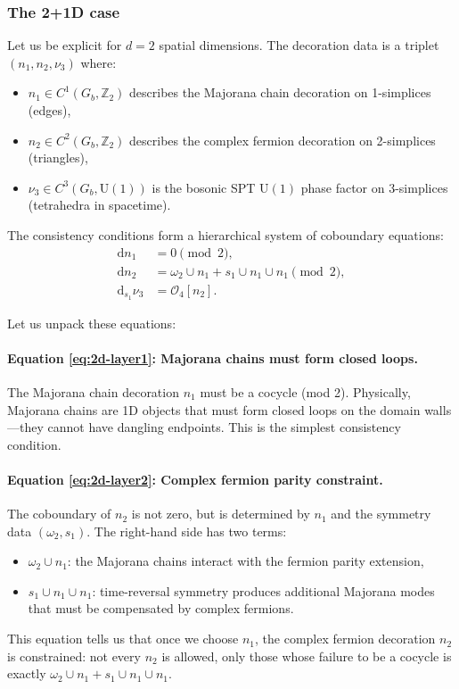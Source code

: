 \documentclass{SciPost}
\theoremstyle{definition}
\newcommand{\Zt}{\mathbb{Z}_2}
\newcommand{\U}{\mathrm{U}}
\newcommand{\Gb}{G_b}
\newcommand{\dd}{\mathrm{d}}
\begin{document}
\subsubsection{The 2+1D case}

Let us be explicit for $d=2$ spatial dimensions.
The decoration data is a triplet $(n_1, n_2, \nu_3)$ where:
\begin{itemize}
    \item $n_1 \in C^1(\Gb, \Zt)$ describes the Majorana chain decoration on 1-simplices (edges),
    \item $n_2 \in C^2(\Gb, \Zt)$ describes the complex fermion decoration on 2-simplices (triangles),
    \item $\nu_3 \in C^3(\Gb, \U(1))$ is the bosonic SPT $\U(1)$ phase factor on 3-simplices (tetrahedra in spacetime).
\end{itemize}

The consistency conditions form a hierarchical system of coboundary equations:
\begin{align}
\dd n_1 &= 0 \pmod{2}, \label{eq:2d-layer1} \\
\dd n_2 &= \omega_2 \cup n_1 + s_1 \cup n_1 \cup n_1 \pmod{2}, \label{eq:2d-layer2} \\
\dd_{s_1} \nu_3 &= \mathcal{O}_4[n_2]. \label{eq:2d-layer3}
\end{align}

Let us unpack these equations:

\paragraph{Equation \eqref{eq:2d-layer1}: Majorana chains must form closed loops.}
The Majorana chain decoration $n_1$ must be a cocycle (mod 2).
Physically, Majorana chains are 1D objects that must form closed loops on the domain walls---they cannot have dangling endpoints.
This is the simplest consistency condition.

\paragraph{Equation \eqref{eq:2d-layer2}: Complex fermion parity constraint.}
The coboundary of $n_2$ is not zero, but is determined by $n_1$ and the symmetry data $(\omega_2, s_1)$.
The right-hand side has two terms:
\begin{itemize}
    \item $\omega_2 \cup n_1$: the Majorana chains interact with the fermion parity extension,
    \item $s_1 \cup n_1 \cup n_1$: time-reversal symmetry produces additional Majorana modes that must be compensated by complex fermions.
\end{itemize}
This equation tells us that once we choose $n_1$, the complex fermion decoration $n_2$ is constrained: not every $n_2$ is allowed, only those whose failure to be a cocycle is exactly $\omega_2 \cup n_1 + s_1 \cup n_1 \cup n_1$.
\end{document}
